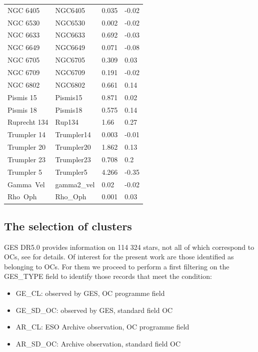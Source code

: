 \documentclass[fleqn,usenatbib]{mnras}
\begin{document}
\begin{table}
\begin{tabular}{l l l l}
            NGC 6405 & NGC6405 & 0.035 & -0.02 \\
            NGC 6530 & NGC6530 & 0.002 & -0.02 \\
            NGC 6633 & NGC6633 & 0.692 & -0.03 \\
            NGC 6649 & NGC6649 & 0.071 & -0.08 \\
            NGC 6705 & NGC6705 & 0.309 & 0.03 \\
            NGC 6709 & NGC6709 & 0.191 & -0.02 \\
            NGC 6802 & NGC6802 & 0.661 & 0.14 \\
            Pismis 15 & Pismis15 & 0.871 & 0.02 \\
            Pismis 18 & Pismis18 & 0.575 & 0.14 \\
            Ruprecht 134 & Rup134 & 1.66 & 0.27 \\
            Trumpler 14 & Trumpler14 & 0.003 & -0.01 \\
            Trumpler 20 & Trumpler20 & 1.862 & 0.13 \\
            Trumpler 23 & Trumpler23 & 0.708 & 0.2 \\
            Trumpler 5 & Trumpler5 & 4.266 & -0.35 \\
            Gamma Vel & gamma2\_vel & 0.02 & -0.02 \\
            Rho Oph & Rho\_Oph & 0.001 & 0.03 \\
		\hline
	\end{tabular}
\end{table}

\subsection{The selection of clusters}
GES DR5.0 provides information on 114 324 stars, not all of which correspond to OCs, see \cite{Gilmore2022} for details. Of interest for the present work are those identified as belonging to OCs. For them we proceed to perform a first filtering on the GES\_TYPE field to identify those records that meet the condition:
\begin{itemize}
    \item GE\_CL: observed by GES, OC programme field
    \item GE\_SD\_OC: observed by GES, standard field OC
    \item AR\_CL: ESO Archive observation, OC programme field
    \item AR\_SD\_OC: Archive observation, standard field OC
\end{itemize}
\end{document}
